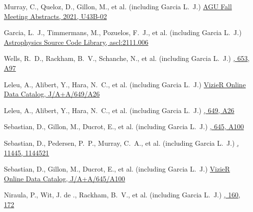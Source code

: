 {Murray, C., Queloz, D., Gillon, M., et al. (including Garcia L.~J.)}
{\href{https://ui.adsabs.harvard.edu/abs/2021AGUFM.U43B..02M}{AGU Fall Meeting Abstracts, 2021, U43B-02}}

{Garcia, L.~J., Timmermans, M., Pozuelos, F.~J., et al. (including Garcia L.~J.)}
{\href{https://ui.adsabs.harvard.edu/abs/2021ascl.soft11006G}{Astrophysics Source Code Library, ascl:2111.006}}

{Wells, R.~D., Rackham, B.~V., Schanche, N., et al. (including Garcia L.~J.)}
{\href{https://ui.adsabs.harvard.edu/abs/2021A\&A...653A..97W}{\aap, 653, A97}}

{Leleu, A., Alibert, Y., Hara, N.~C., et al. (including Garcia L.~J.)}
{\href{https://ui.adsabs.harvard.edu/abs/2021yCat..36490026L}{VizieR Online Data Catalog, J/A+A/649/A26}}

{Leleu, A., Alibert, Y., Hara, N.~C., et al. (including Garcia L.~J.)}
{\href{https://ui.adsabs.harvard.edu/abs/2021A\&A...649A..26L}{\aap, 649, A26}}

{Sebastian, D., Gillon, M., Ducrot, E., et al. (including Garcia L.~J.)}
{\href{https://ui.adsabs.harvard.edu/abs/2021A\&A...645A.100S}{\aap, 645, A100}}

{Sebastian, D., Pedersen, P.~P., Murray, C.~A., et al. (including Garcia L.~J.)}
{\href{https://ui.adsabs.harvard.edu/abs/2020SPIE11445E..21S}{\procspie, 11445, 1144521}}

{Sebastian, D., Gillon, M., Ducrot, E., et al. (including Garcia L.~J.)}
{\href{https://ui.adsabs.harvard.edu/abs/2020yCat..36450100S}{VizieR Online Data Catalog, J/A+A/645/A100}}

{Niraula, P., Wit, J. de ., Rackham, B.~V., et al. (including Garcia L.~J.)}
{\href{https://ui.adsabs.harvard.edu/abs/2020AJ....160..172N}{\aj, 160, 172}}

